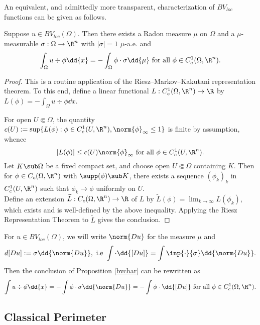 \documentclass[../main.tex]{subfiles}
\begin{document}
An equivalent, and admittedly more transparent, characterization of $ BV_{loc} $ functions can be given as follows. 

\begin{proposition}\label{bvchar}
    Suppose $ u\in BV_{loc}(\Omega) $. Then there exists a Radon measure $ \mu $ on $ \Omega $ and a $ \mu $-measurable $ \sigma:\Omega\to \R^{n} $ with $ | \sigma| = 1$ $ \mu $-a.e. and
    \[
        \int_{\Omega} u\div{\phi}\dd{x} = -\int_{\Omega} \phi\cdot \sigma \dd{\mu} \text{ for all } \phi\in C_{c}^{1}(\Omega,\R^{n}).
    \]
\end{proposition}

\begin{proof}
    This is a routine application of the Riesz–Markov–Kakutani representation theorem. To this end, define a linear functional $ L:C_{c}^{1}(\Omega,\R^{n}) \to \R $ by $ L(\phi) = -\int_{\Omega} u\div{\phi}\dd{x} $.
    
    For open $ U\Subset \Omega $, the quantity $ c(U):= \sup\{L(\phi) : \phi\in C_{c}^{1}(U,\R^{n}), \norm{\phi}_{\infty} \leq 1\} $ is finite by assumption, whence 
    \[
        |L(\phi)| \leq c(U) \norm{\phi}_{\infty} \text{ for all } \phi\in C_{c}^{1}(U,\R^{n}).
    \]
    Let $ K\sub \Omega $ be a fixed compact set, and choose open $ U\Subset\Omega $ containing $ K $. Then for $ \phi\in C_{c}(\Omega,\R^{n}) $ with $ \supp(\phi)\sub K $, there exists a sequence $ (\phi_{k})_{k} $ in $ C_{c}^{1}(U,\R^{n}) $ such that $ \phi_{k}\to \phi $ uniformly on $ U $. \\

    Define an extension $ \widetilde{L}:C_{c}(\Omega,\R^{n})\to \R $ of $ L $ by $ \widetilde{L}(\phi) = \lim_{k\to\infty}L(\phi_{k}) $, which exists and is well-defined by the above inequality. Applying the Riesz Representation Theorem to $ \widetilde{L} $ gives the conclusion.
\end{proof}

\begin{definition}
    For $ u\in BV_{loc}(\Omega) $, we will write $ \norm{Du} $ for the measure $ \mu $ and 
    \[
        d[Du] := \sigma \dd{\norm{Du}}, \text{ i.e } \int\cdot \dd{[Du]} = \int \inp{\cdot}{\sigma}\dd{\norm{Du}}.
    \]
    Then the conclusion of Proposition \ref{bvchar} can be rewritten as
    \[
        \int u\div{\phi} \dd{x} = -\int \phi \cdot \sigma \dd{\norm{Du}} = -\int \phi \cdot \dd{[Du]} \text{ for all } \phi\in C_{c}^{1}(\Omega,\R^{n}).
    \]
\end{definition}


\subsection{Classical Perimeter}

\end{document}
